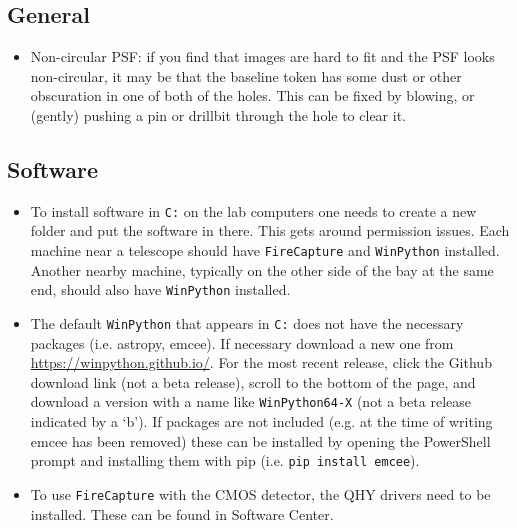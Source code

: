 \documentclass[11pt]{article}
\begin{document}
\subsection{General}

\begin{itemize}
    \item Non-circular PSF: if you find that images are hard to fit and the PSF looks non-circular, it may be that the baseline token has some dust or other obscuration in one of both of the holes. This can be fixed by blowing, or (gently) pushing a pin or drillbit through the hole to clear it.
\end{itemize}

\subsection{Software}

\begin{itemize}
    \item To install software in \texttt{C:} on the lab computers one needs to create a new folder and put the software in there. This gets around permission issues. Each machine near a telescope should have \texttt{FireCapture} and \texttt{WinPython} installed. Another nearby machine, typically on the other side of the bay at the same end, should also have \texttt{WinPython} installed.

    \item The default \texttt{WinPython} that appears in \texttt{C:} does not have the necessary packages (i.e. astropy, emcee). If necessary download a new one from \href{https://winpython.github.io/}{https://winpython.github.io/}. For the most recent release, click the Github download link (not a beta release), scroll to the bottom of the page, and download a version with a name like \texttt{WinPython64-X} (not a beta release indicated by a `b'). If packages are not included (e.g. at the time of writing emcee has been removed) these can be installed by opening the PowerShell prompt and installing them with pip (i.e. \texttt{pip install emcee}).

    \item To use \texttt{FireCapture} with the CMOS detector, the QHY drivers need to be installed. These can be found in Software Center.
\end{itemize}

\clearpage



\end{document}
